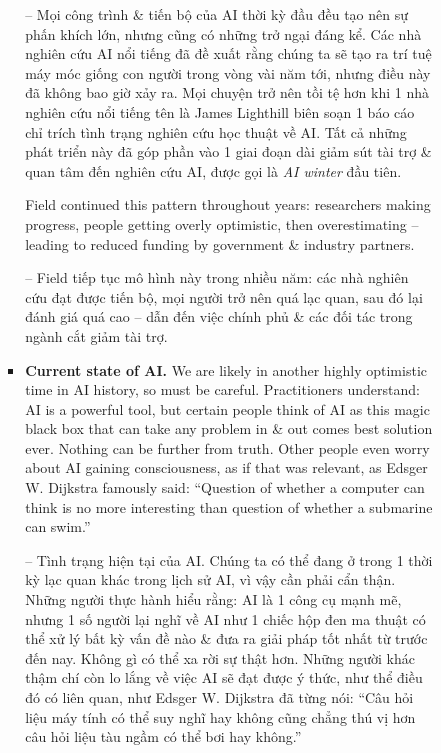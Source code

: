\documentclass{article}
\begin{document}
\begin{itemize}
\begin{itemize}
\begin{itemize}
\begin{itemize}
                -- Mọi công trình \& tiến bộ của AI thời kỳ đầu đều tạo nên sự phấn khích lớn, nhưng cũng có những trở ngại đáng kể. Các nhà nghiên cứu AI nổi tiếng đã đề xuất rằng chúng ta sẽ tạo ra trí tuệ máy móc giống con người trong vòng vài năm tới, nhưng điều này đã không bao giờ xảy ra. Mọi chuyện trở nên tồi tệ hơn khi 1 nhà nghiên cứu nổi tiếng tên là {\sc James Lighthill} biên soạn 1 báo cáo chỉ trích tình trạng nghiên cứu học thuật về AI. Tất cả những phát triển này đã góp phần vào 1 giai đoạn dài giảm sút tài trợ \& quan tâm đến nghiên cứu AI, được gọi là {\it AI winter} đầu tiên.

                Field continued this pattern throughout years: researchers making progress, people getting overly optimistic, then overestimating -- leading to reduced funding by government \& industry partners.

                -- Field tiếp tục mô hình này trong nhiều năm: các nhà nghiên cứu đạt được tiến bộ, mọi người trở nên quá lạc quan, sau đó lại đánh giá quá cao -- dẫn đến việc chính phủ \& các đối tác trong ngành cắt giảm tài trợ.
                \item {\bf Current state of AI.} We are likely in another highly optimistic time in AI history, so must be careful. Practitioners understand: AI is a powerful tool, but certain people think of AI as this magic black box that can take any problem in \& out comes best solution ever. Nothing can be further from truth. Other people even worry about AI gaining consciousness, as if that was relevant, as {\sc Edsger W. Dijkstra} famously said: ``Question of whether a computer can think is no more interesting than question of whether a submarine can swim.''

                -- {\sf Tình trạng hiện tại của AI.} Chúng ta có thể đang ở trong 1 thời kỳ lạc quan khác trong lịch sử AI, vì vậy cần phải cẩn thận. Những người thực hành hiểu rằng: AI là 1 công cụ mạnh mẽ, nhưng 1 số người lại nghĩ về AI như 1 chiếc hộp đen ma thuật có thể xử lý bất kỳ vấn đề nào \& đưa ra giải pháp tốt nhất từ trước đến nay. Không gì có thể xa rời sự thật hơn. Những người khác thậm chí còn lo lắng về việc AI sẽ đạt được ý thức, như thể điều đó có liên quan, như {\sc Edsger W. Dijkstra} đã từng nói: ``Câu hỏi liệu máy tính có thể suy nghĩ hay không cũng chẳng thú vị hơn câu hỏi liệu tàu ngầm có thể bơi hay không.''


\end{itemize}
\end{itemize}
\end{itemize}
\end{itemize}
\end{document}
